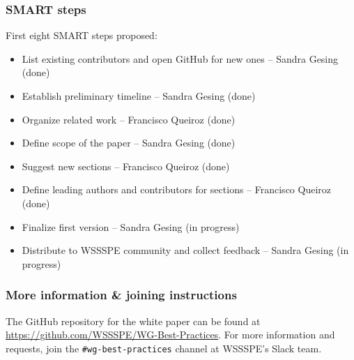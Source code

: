 \subsubsection{SMART steps}

First eight SMART steps proposed: \\
\begin{itemize}
\item List existing contributors and open GitHub for new ones -- Sandra Gesing (done)
\item Establish preliminary timeline  -- Sandra Gesing (done)
\item Organize related work -- Francisco Queiroz (done)
\item Define scope of the paper -- Sandra Gesing (done)
\item Suggest new sections -- Francisco Queiroz (done)
\item Define leading authors and contributors for sections -- Francisco Queiroz (done)
\item Finalize first version -- Sandra Gesing (in progress)
\item Distribute to WSSSPE community and collect feedback -- Sandra Gesing (in progress)
\end{itemize}

\subsubsection{More information \& joining instructions}

The GitHub repository for the white paper can be found at \url{https://github.com/WSSSPE/WG-Best-Practices}. For more information and requests, join the \texttt{\#wg-best-practices} channel at WSSSPE's Slack team.
